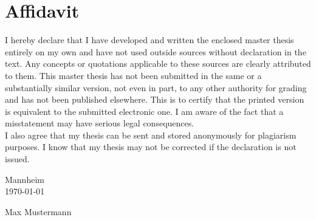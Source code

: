 \chapter*{\large Affidavit}
\pagestyle{empty}
I hereby declare that I have developed and written the enclosed master thesis entirely on my own and have not used outside sources without declaration in the text. Any concepts or quotations applicable to these sources are clearly attributed to them. This  master thesis has not been submitted in the same or a substantially similar version, not even in part, to any other authority for grading and has not been published elsewhere. This is to certify that the printed version is equivalent to the submitted electronic one. I am aware of the fact that a misstatement may have serious legal consequences.\\

I also agree that my thesis can be sent and stored anonymously for plagiarism purposes. I know that my thesis may not be corrected if the declaration is not issued.


\vspace{2.0cm}

Mannheim\\
\vspace{1cm}
\hspace{0.1cm} \today



\vspace{2cm}
Max Mustermann